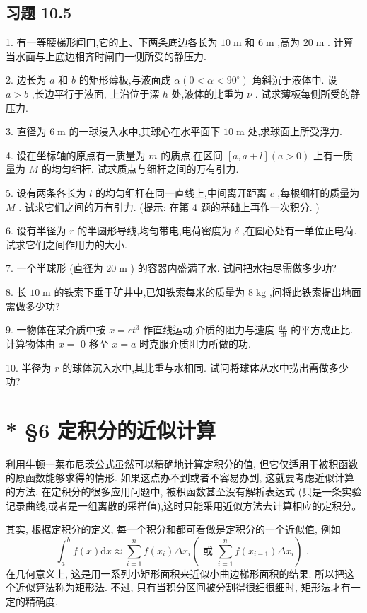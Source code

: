 \subsection{习题 10.5}

1. 有一等腰梯形闸门,它的上、下两条底边各长为 \({10}\mathrm{\;m}\) 和 \(6\mathrm{\;m}\) ,高为 \({20}\mathrm{\;m}\) . 计算当水面与上底边相齐时闸门一侧所受的静压力.

2. 边长为 \(a\) 和 \(b\) 的矩形薄板,与液面成 \(\alpha \left( {0 < \alpha  < {90}^{ \circ  }}\right)\) 角斜沉于液体中. 设 \(a > b\) ,长边平行于液面, 上沿位于深 \(h\) 处,液体的比重为 \(\nu\) . 试求薄板每侧所受的静压力.

3. 直径为 \(6\mathrm{\;m}\) 的一球浸入水中,其球心在水平面下 \({10}\mathrm{\;m}\) 处,求球面上所受浮力.

4. 设在坐标轴的原点有一质量为 \(m\) 的质点,在区间 \(\left\lbrack  {a,a + l}\right\rbrack  \left( {a > 0}\right)\) 上有一质量为 \(M\) 的均匀细杆. 试求质点与细杆之间的万有引力.

5. 设有两条各长为 \(l\) 的均匀细杆在同一直线上,中间离开距离 \(c\) ,每根细杆的质量为 \(M\) . 试求它们之间的万有引力. (提示: 在第 4 题的基础上再作一次积分. )

6. 设有半径为 \(r\) 的半圆形导线,均匀带电,电荷密度为 \(\delta\) ,在圆心处有一单位正电荷. 试求它们之间作用力的大小.

7. 一个半球形 (直径为 \({20}\mathrm{\;m}\) ) 的容器内盛满了水. 试问把水抽尽需做多少功?

8. 长 \({10}\mathrm{\;m}\) 的铁索下垂于矿井中,已知铁索每米的质量为 \(8\mathrm{\;{kg}}\) ,问将此铁索提出地面需做多少功?

9. 一物体在某介质中按 \(x = c{t}^{3}\) 作直线运动,介质的阻力与速度 \(\frac{\mathrm{d}x}{\mathrm{\;d}t}\) 的平方成正比. 计算物体由 \(x =\) 0 移至 \(x = a\) 时克服介质阻力所做的功.

10. 半径为 \(r\) 的球体沉入水中,其比重与水相同. 试问将球体从水中捞出需做多少功?

\section{* §6 定积分的近似计算}

利用牛顿一莱布尼茨公式虽然可以精确地计算定积分的值, 但它仅适用于被积函数的原函数能够求得的情形. 如果这点办不到或者不容易办到, 这就要考虑近似计算的方法. 在定积分的很多应用问题中, 被积函数甚至没有解析表达式 (只是一条实验记录曲线,或者是一组离散的采样值),这时只能采用近似方法去计算相应的定积分。

其实, 根据定积分的定义, 每一个积分和都可看做是定积分的一个近似值, 例如
\[
{\int }_{a}^{b}f\left( x\right) \mathrm{d}x \approx  \mathop{\sum }\limits_{{i = 1}}^{n}f\left( {x}_{i}\right) \Delta {x}_{i}\left( \right. \text{ 或 }\left. {\mathop{\sum }\limits_{{i = 1}}^{n}f\left( {x}_{i - 1}\right) \Delta {x}_{i}}\right) \text{ . } \tag{1}
\]
在几何意义上, 这是用一系列小矩形面积来近似小曲边梯形面积的结果. 所以把这个近似算法称为矩形法. 不过, 只有当积分区间被分割得很细很细时, 矩形法才有一定的精确度.


